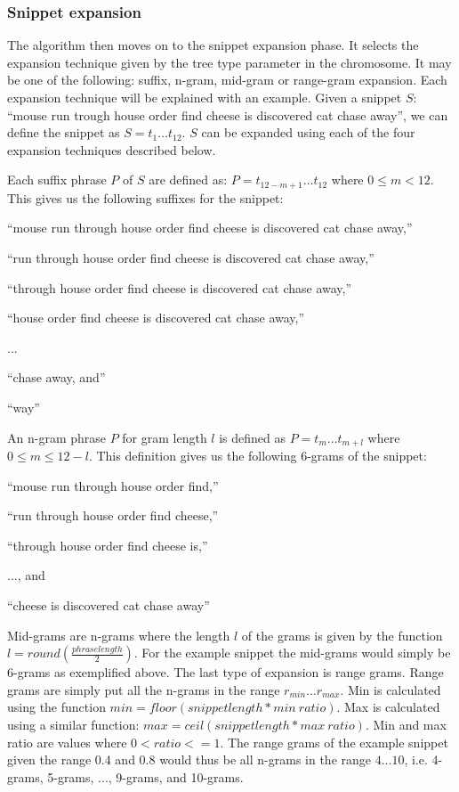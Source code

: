 \subsubsection{Snippet expansion}
The algorithm then moves on to the snippet expansion phase. It selects the expansion technique given by the tree type parameter in the chromosome. It may be one of the following: suffix, n-gram, mid-gram or range-gram expansion. Each expansion technique will be explained with an example. Given a snippet \(S\): ``mouse run trough house order find cheese is discovered cat chase away'', we can define the snippet as \(S = t_{1} \dots t_{12}\). \(S\) can be expanded using each of the four expansion techniques described below.

Each suffix phrase \(P\)  of \(S\) are defined as: \(P = t_{12-m+1} \dots t_{12}\) where \(0 \le m < 12\). This gives us the following suffixes for the snippet:
\begin{inparaenum}[\itshape 1\upshape)]
\item ``mouse run through house order find cheese is discovered cat chase away,''
\item ``run through house order find cheese is discovered cat chase away,''
\item ``through house order find cheese is discovered cat chase away,''
\item ``house order find cheese is discovered cat chase away,''
\item ...
\item ``chase away, and''
\item ``way''
\end{inparaenum}


An n-gram phrase \(P\) for gram length \(l\) is defined as \(P = t_{m} \dots t_{m+l}\) where \(0 \le m \le 12 - l\). This definition gives us the following 6-grams of the snippet:
\begin{inparaenum}[\itshape 1\upshape)]
\item ``mouse run through house order find,''
\item ``run through house order find cheese,''
\item ``through house order find cheese is,''
\item ..., and
\item ``cheese is discovered cat chase away''
\end{inparaenum}

Mid-grams are n-grams where the length \(l\) of the grams is given by the function \(l = round(\frac{phraselength}{2})\). For the example snippet the mid-grams would simply be 6-grams as exemplified above. The last type of expansion is range grams. Range grams are simply put all the n-grams in the range \(r_{min} \dots r_{max}\). Min is calculated using the function \(min = floor(snippet length * min~ratio)\). Max is calculated using a similar function: \(max = ceil(snippet length * max~ratio)\).  Min and max ratio are values where \(0 < ratio <= 1\). The range grams of the example snippet given the range 0.4 and 0.8 would thus be all n-grams in the range \(4 \dots 10\), i.e. 4-grams, 5-grams, ..., 9-grams, and 10-grams.

